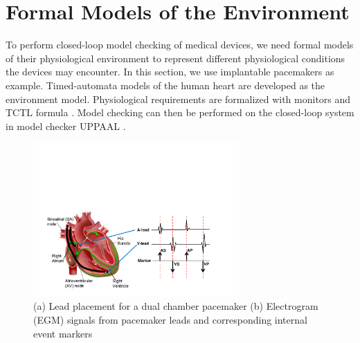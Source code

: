 \section{Formal Models of the Environment}
\label{formalModelsofEnv}
To perform closed-loop model checking of medical devices, we need formal models of their physiological environment to represent different physiological conditions the devices may encounter. In this section, we use implantable pacemakers as example. Timed-automata \cite{timed_automata} models of the human heart are developed as the environment model. Physiological requirements are formalized with monitors and TCTL formula  \cite{TCTL}. Model checking can then be performed on the closed-loop system in model checker UPPAAL \cite{uppaal}. %
\begin{figure}[!t]
	\centering
	\includegraphics[width=0.7\textwidth]{figs/egm.pdf}
	
	\caption{\small (a) Lead placement for a dual chamber pacemaker (b) Electrogram (EGM) signals from pacemaker leads and corresponding internal event markers}
	\label{fig:probes}
\end{figure} 
